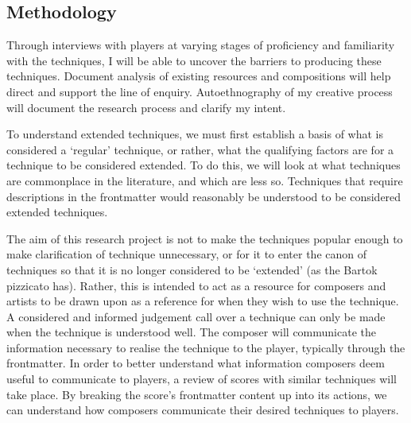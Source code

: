 
\subsection{Methodology}
Through interviews with players at varying stages of proficiency and familiarity with the techniques, I will be able to uncover the barriers to producing these techniques. 
Document analysis of existing resources and compositions will help direct and support the line of enquiry. 
Autoethnography of my creative process will document the research process and clarify my intent.  

To understand extended techniques, we must first establish a basis of what is considered a `regular' technique, or rather, what the qualifying factors are for a technique to be considered extended.
To do this, we will look at what techniques are commonplace in the literature, and which are less so.
Techniques that require descriptions in the frontmatter would reasonably be understood to be considered extended techniques.

The aim of this research project is not to make the techniques popular enough to make clarification of technique unnecessary, or for it to enter the canon of techniques so that it is no longer considered to be `extended' (as the Bartok pizzicato has).
Rather, this is intended to act as a resource for composers and artists to be drawn upon as a reference for when they wish to use the technique.
A considered and informed judgement call over a technique can only be made when the technique is understood well.
The composer will communicate the information necessary to realise the technique to the player, typically through the frontmatter. 
In order to better understand what information composers deem useful to communicate to players, a review of scores with similar techniques will take place.
By breaking the score's frontmatter content up into its actions, we can understand how composers communicate their desired techniques to players.
